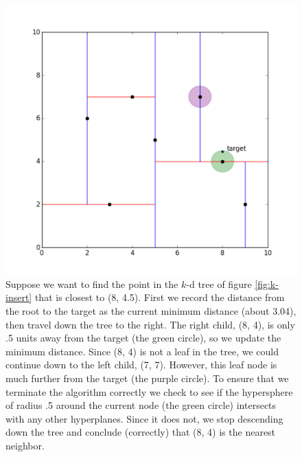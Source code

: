 \begin{figure}[H]
\includegraphics[width=\textwidth]{figures/kdpic3.pdf}
\caption{Suppose we want to find the point in the $k$-d tree of figure \ref{fig:k-insert} that is closest to (8, 4.5). First we record the distance from the root to the target as the current minimum distance (about 3.04), then travel down the tree to the right. The right child, (8, 4), is only .5 units away from the target (the green circle), so we update the minimum distance. Since (8, 4) is not a leaf in the tree, we could continue down to the left child, (7, 7). However, this leaf node is much further from the target (the purple circle). To ensure that we terminate the algorithm correctly we check to see if the hypersphere of radius .5 around the current node (the green circle) intersects with any other hyperplanes. Since it does not, we stop descending down the tree and conclude (correctly) that (8, 4) is the nearest neighbor.}
\label{fig:bad-search}
\end{figure}

